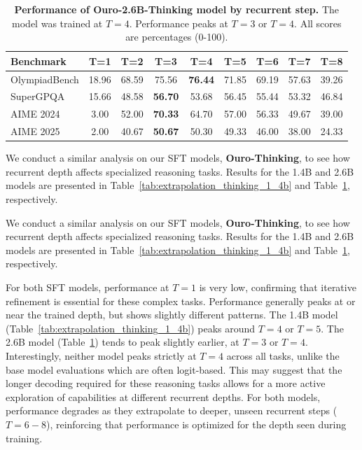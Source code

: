 \documentclass[]{bytedance_seed}
\newcommand{\1}{\mathbf{1}}
\begin{document}
\begin{table}
\centering
\caption{\textbf{Performance of Ouro-2.6B-Thinking model by recurrent step.} The model was trained at $T=4$. Performance peaks at $T=3$ or $T=4$. All scores are percentages (0-100).}
\label{tab:extrapolation_thinking_2_6b}
\small
\setlength{\tabcolsep}{5pt}
\begin{tabular}{@{}l|cccccccc@{}}
\toprule
\textbf{Benchmark} & \textbf{T=1} & \textbf{T=2} & \textbf{T=3} & \textbf{T=4} & \textbf{T=5} & \textbf{T=6} & \textbf{T=7} & \textbf{T=8} \\
\midrule
OlympiadBench & 18.96 & 68.59 & 75.56 & \textbf{76.44} & 71.85 & 69.19 & 57.63 & 39.26 \\
SuperGPQA     & 15.66 & 48.58 & \textbf{56.70} & 53.68 & 56.45 & 55.44 & 53.32 & 46.84 \\
AIME 2024     & 3.00 & 52.00 & \textbf{70.33} & 64.70 & 57.00 & 56.33 & 49.67 & 39.00 \\
AIME 2025     & 2.00 & 40.67 & \textbf{50.67} & 50.30 & 49.33 & 46.00 & 38.00 & 24.33 \\
\bottomrule
\end{tabular}
\end{table}
We conduct a similar analysis on our SFT models, \textbf{Ouro-Thinking}, to see how recurrent depth affects specialized reasoning tasks. Results for the 1.4B and 2.6B models are presented in Table~\ref{tab:extrapolation_thinking_1_4b} and Table~\ref{tab:extrapolation_thinking_2_6b}, respectively.

We conduct a similar analysis on our SFT models, \textbf{Ouro-Thinking}, to see how recurrent depth affects specialized reasoning tasks. Results for the 1.4B and 2.6B models are presented in Table~\ref{tab:extrapolation_thinking_1_4b} and Table~\ref{tab:extrapolation_thinking_2_6b}, respectively.

For both SFT models, performance at $T=1$ is very low, confirming that iterative refinement is essential for these complex tasks. Performance generally peaks at or near the trained depth, but shows slightly different patterns. The 1.4B model (Table~\ref{tab:extrapolation_thinking_1_4b}) peaks around $T=4$ or $T=5$. The 2.6B model (Table~\ref{tab:extrapolation_thinking_2_6b}) tends to peak slightly earlier, at $T=3$ or $T=4$. Interestingly, neither model peaks strictly at $T=4$ across all tasks, unlike the base model evaluations which are often logit-based. This may suggest that the longer decoding required for these reasoning tasks allows for a more active exploration of capabilities at different recurrent depths. For both models, performance degrades as they extrapolate to deeper, unseen recurrent steps ($T=6-8$), reinforcing that performance is optimized for the depth seen during training.
\end{document}
